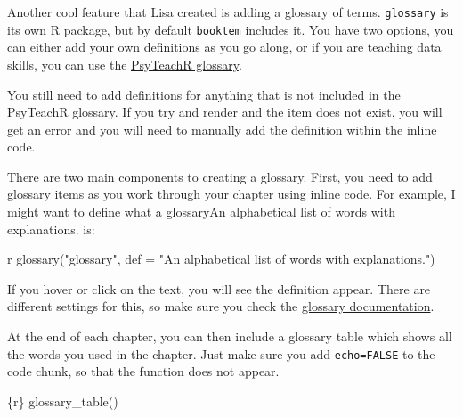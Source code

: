 \documentclass[
  letterpaper,
  DIV=11,
  numbers=noendperiod]{scrreprt}
\newenvironment{Shaded}{\begin{snugshade}}{\end{snugshade}}
\newcommand{\AttributeTok}[1]{\textcolor[rgb]{0.40,0.45,0.13}{#1}}
\newcommand{\InformationTok}[1]{\textcolor[rgb]{0.37,0.37,0.37}{#1}}
\newcommand{\StringTok}[1]{\textcolor[rgb]{0.13,0.47,0.30}{#1}}
\begin{document}
Another cool feature that Lisa created is adding a glossary of terms.
\texttt{glossary} is its own R package, but by default \texttt{booktem}
includes it. You have two options, you can either add your own
definitions as you go along, or if you are teaching data skills, you can
use the \href{https://psyteachr.github.io/glossary/}{PsyTeachR
glossary}.

\begin{tcolorbox}[enhanced jigsaw, colbacktitle=quarto-callout-important-color!10!white, titlerule=0mm, leftrule=.75mm, title=\textcolor{quarto-callout-important-color}{\faExclamation}\hspace{0.5em}{Important}, breakable, bottomrule=.15mm, opacitybacktitle=0.6, rightrule=.15mm, opacityback=0, arc=.35mm, colframe=quarto-callout-important-color-frame, toptitle=1mm, bottomtitle=1mm, toprule=.15mm, left=2mm, colback=white, coltitle=black]

You still need to add definitions for anything that is not included in
the PsyTeachR glossary. If you try and render and the item does not
exist, you will get an error and you will need to manually add the
definition within the inline code.

\end{tcolorbox}

There are two main components to creating a glossary. First, you need to
add glossary items as you work through your chapter using inline code.
For example, I might want to define what a glossary{An alphabetical list
of words with explanations.} is:

\begin{Shaded}
\begin{Highlighting}[]
\StringTok{\textasciigrave{}}\AttributeTok{r glossary("glossary", def = "An alphabetical list of words with explanations.")}\StringTok{\textasciigrave{}}
\end{Highlighting}
\end{Shaded}

If you hover or click on the text, you will see the definition appear.
There are different settings for this, so make sure you check the
\href{https://debruine.github.io/glossary/articles/glossary.html}{glossary
documentation}.

At the end of each chapter, you can then include a glossary table which
shows all the words you used in the chapter. Just make sure you add
\texttt{echo=FALSE} to the code chunk, so that the function does not
appear.

\begin{Shaded}
\begin{Highlighting}[]
\InformationTok{\textasciigrave{}\textasciigrave{}\textasciigrave{}\{r\}}
\InformationTok{glossary\_table()}
\InformationTok{\textasciigrave{}\textasciigrave{}\textasciigrave{}}
\end{Highlighting}
\end{Shaded}
\end{document}
